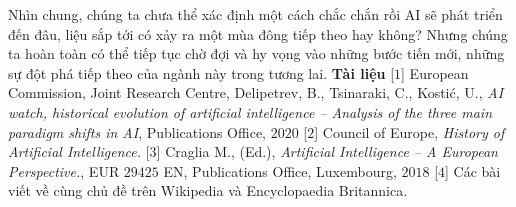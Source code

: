 \begin{multicols}{2}
	\vskip 0.1cm
	Nhìn chung, chúng ta chưa thể xác định một cách chắc chắn rồi AI sẽ phát triển đến đâu, liệu sắp tới có xảy ra một mùa đông tiếp
	theo hay không? Nhưng chúng ta hoàn toàn có thể tiếp tục chờ đợi và hy vọng vào những bước tiến mới, những sự đột phá tiếp theo của ngành này trong tương lai.  
	\vskip 0.1cm
	\textbf{\color{timhieukhoahoc}Tài liệu}
	\vskip 0.1cm
	[$1$] European Commission, Joint Research Centre, Delipetrev, B., Tsinaraki, C., Kostić, U., \textit{AI watch, historical evolution of artificial intelligence -- Analysis of the three main paradigm shifts in AI}, Publications Office, $2020$
	\vskip 0.1cm
	[$2$] Council of Europe, \textit{History of Artificial Intelligence.}
	\vskip 0.1cm	
	[$3$] Craglia M., (Ed.), \textit{Artificial Intelligence -- A European Perspective.}, EUR $29425$ EN, Publications Office, Luxembourg, $2018$
	\vskip 0.1cm
	[$4$] Các bài viết về cùng chủ đề trên Wikipedia và Encyclopaedia Britannica.
\end{multicols}